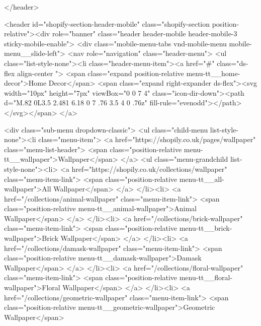 {{{{{{{</header>
  
    <header id="shopify-section-header-mobile" class="shopify-section position-relative"><div role="banner" class="header header-mobile header-mobile-3 sticky-mobile-enable">
<div class="mobile-menu-tabs vnd-mobile-menu mobile-menu__slide-left">
<nav role="navigation" class="header-menu">
  <ul class="list-style-none"><li class="header-menu-item"><a href="#" class="ds-flex align-center ">
          <span class="expand position-relative menu-tt__home-decor">Home Decor</span>
          <span class="expand right-expander ds-flex"><svg width="10px" height="7px" viewBox="0 0 7 4" class="icon-dir-down"><path d="M.82 0L3.5 2.481 6.18 0 7 .76 3.5 4 0 .76z" fill-rule="evenodd"></path></svg></span>
        </a>

        <div class="sub-menu dropdown-classic">
          <ul class="child-menu list-style-none"><li class="menu-item">
                  <a href="https://shopily.co.uk/pages/wallpaper" class="menu-list-header">
                    <span class="position-relative menu-tt__wallpaper">Wallpaper</span>
                  </a>
                  <ul class="menu-grandchild list-style-none"><li>
                        <a href="https://shopily.co.uk/collections/wallpaper" class="menu-item-link">
                          <span class="position-relative menu-tt__all-wallpaper">All Wallpaper</span>
                        </a>
                      </li><li>
                        <a href="/collections/animal-wallpaper" class="menu-item-link">
                          <span class="position-relative menu-tt__animal-wallpaper">Animal Wallpaper</span>
                        </a>
                      </li><li>
                        <a href="/collections/brick-wallpaper" class="menu-item-link">
                          <span class="position-relative menu-tt__brick-wallpaper">Brick Wallpaper</span>
                        </a>
                      </li><li>
                        <a href="/collections/damask-wallpaper" class="menu-item-link">
                          <span class="position-relative menu-tt__damask-wallpaper">Damask Wallpaper</span>
                        </a>
                      </li><li>
                        <a href="/collections/floral-wallpaper" class="menu-item-link">
                          <span class="position-relative menu-tt__floral-wallpaper">Floral Wallpaper</span>
                        </a>
                      </li><li>
                        <a href="/collections/geometric-wallpaper" class="menu-item-link">
                          <span class="position-relative menu-tt__geometric-wallpaper">Geometric Wallpaper</span>
}}}}}}}

